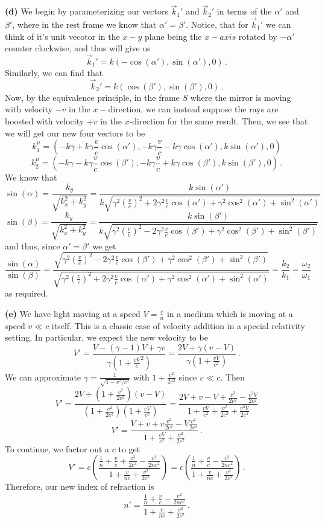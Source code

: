 \documentclass[10pt]{article}
\begin{document}
\textbf{(d)} We begin by parameterizing our vectors $\vec{k}_{1}'$ and $\vec{k}_{2}'$ in terms of the $\alpha'$ and $\beta'$, where in the rest frame we know that $\alpha' = \beta'$. Notice, that for $\vec{k}_{1}'$ we can think of it's unit vecotor in the $x-y$ plane being the $x-axis$ rotated by $-\alpha'$ counter clockwise, and thus will give us
\[ \vec{k}_{1}' = k(-\cos(\alpha'), \sin(\alpha'),0) \, .\]
Similarly, we can find that
\[ \vec{k}_{2}' = k(\cos(\beta'), \sin(\beta'),0) \, .\]
Now, by the equivalence principle, in the frame $S$ where the mirror is moving with velocity $-v$ in the $x-$direction, we can instead suppose the rays are boosted with velocity $+v$ in the $x$-direction for the same result. Then, we see that we will get our new four vectors to be
\[ k_{1}^{\mu} = \left(-k\gamma +k\gamma\frac{v}{c}\cos(\alpha'), -k\gamma\frac{v}{c} - k\gamma\cos(\alpha'), k\sin(\alpha'), 0\right) \]
\[ k_{2}^{\mu} = \left(-k\gamma -k\gamma\frac{v}{c}\cos(\beta'), -k\gamma\frac{v}{c} + k\gamma\cos(\beta'), k\sin(\beta'), 0\right) \, .\]
We know that
\[ \sin(\alpha) = \frac{k_{y}}{\sqrt{k_{x}^{2} + k_{y}^{2}}} = \frac{k\sin(\alpha')}{k\sqrt{\gamma^{2}\left(\frac{v}{c}\right)^{2} + 2\gamma^{2}\frac{v}{c}\cos(\alpha') + \gamma^{2}\cos^{2}(\alpha') + \sin^{2}(\alpha')}} \]
\[ \sin(\beta) = \frac{k_{y}}{\sqrt{k_{x}^{2} + k_{y}^{2}}} = \frac{k\sin(\beta')}{k\sqrt{\gamma^{2}\left(\frac{v}{c}\right)^{2} - 2\gamma^{2}\frac{v}{c}\cos(\beta') + \gamma^{2}\cos^{2}(\beta') + \sin^{2}(\beta')}} \]
and thus, since $\alpha' = \beta'$ we get
\[ \frac{\sin(\alpha)}{\sin(\beta)} = \frac{\sqrt{\gamma^{2}\left(\frac{v}{c}\right)^{2} - 2\gamma^{2}\frac{v}{c}\cos(\beta') + \gamma^{2}\cos^{2}(\beta') + \sin^{2}(\beta')}}{\sqrt{\gamma^{2}\left(\frac{v}{c}\right)^{2} + 2\gamma^{2}\frac{v}{c}\cos(\alpha') + \gamma^{2}\cos^{2}(\alpha') + \sin^{2}(\alpha')}} = \frac{k_{2}}{k_{1}} = \frac{\omega_{2}}{\omega_{1}} \]
as required.

\textbf{(e)} We have light moving at a speed $V = \frac{c}{n}$ in a medium which is moving at a speed $v \ll c$ itself. This is a classic case of velocity addition in a special relativity setting. In particular, we expect the new velocity to be
\[ V' = \frac{V  - (\gamma - 1)V + \gamma v}{\gamma(1+\frac{vV}c^{2})} = \frac{2V + \gamma(v - V)}{\gamma(1+ \frac{vV}{c^{2}})} \, .\]
We can approximate $\gamma = \frac{1}{\sqrt{1 - v^{2}/c^{2}}}$ with $1 + \frac{v^{2}}{2c^{2}}$ since $v \ll c$. Then
\[ V' = \frac{2V + (1 + \frac{v^{2}}{2c^{2}})(v - V)}{(1 + \frac{v^{2}}{2c^{2}})(1 + \frac{vV}{c^{2}})} = \frac{2V + v - V + \frac{v^{3}}{2c^{2}} - \frac{v^{2}V}{2c^{2}}}{1 + \frac{vV}{c^{2}} + \frac{v^{2}}{2c^{2}} + \frac{v^{3}V}{2c^{4}}} \]
\[ V' = \frac{V + v + v\frac{v^{2}}{2c^{2}} - V\frac{v^{2}}{2c^{2}}}{1 + \frac{vV}{c^{2}} + \frac{v^{2}}{2c^{2}}}\, . \]
To continue, we factor out a $c$ to get
\[ V' = c\left(\frac{\frac{1}{n} + \frac{v}{c} + \frac{v^{3}}{2c^{3}} - \frac{v^{2}}{2nc^{2}}}{1 + \frac{v}{nc} + \frac{v^{2}}{2c^{2}}}\right) = c\left(\frac{\frac{1}{n} + \frac{v}{c} - \frac{v^{2}}{2nc^{2}}}{1 + \frac{v}{nc} + \frac{v^{2}}{2c^{2}}}\right) \, .\]
Therefore, our new index of refraction is
\[ n' = \frac{\frac{1}{n} + \frac{v}{c} - \frac{v^{2}}{2nc^{2}}}{1 + \frac{v}{nc} + \frac{v^{2}}{2c^{2}}} \, .\]
\end{document}
